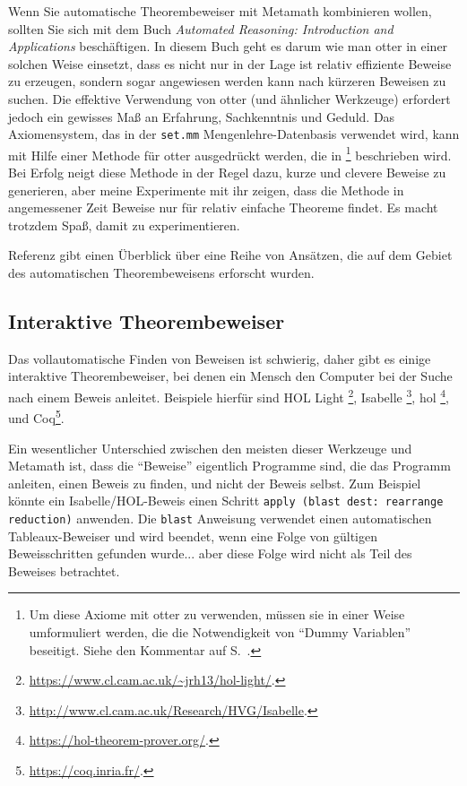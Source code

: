 Wenn Sie automatische Theorembeweiser mit Metamath kombinieren wollen, sollten Sie sich mit dem Buch {\em Automated Reasoning:  Introduction and Applications}\cite{Wos} beschäftigen.  In diesem Buch geht es darum wie man {\sc otter} in einer solchen Weise einsetzt, dass es nicht nur in der Lage ist relativ effiziente Beweise zu erzeugen, sondern sogar angewiesen werden kann nach kürzeren Beweisen zu suchen.  Die effektive Verwendung von {\sc otter} (und ähnlicher Werkzeuge) erfordert jedoch ein gewisses Maß an Erfahrung, Sachkenntnis und Geduld.  Das Axiomensystem, das in der \texttt{set.mm} Mengenlehre-Datenbasis verwendet wird, kann mit Hilfe einer Methode für {\sc otter} ausgedrückt werden, die in \cite{Megill}
\footnote{Um diese Axiome mit {\sc otter} zu verwenden, müssen sie in einer Weise umformuliert werden, die die Notwendigkeit von "`Dummy Variablen"' beseitigt. Siehe den Kommentar
auf S.~\pageref{nodd}.}
beschrieben wird. Bei Erfolg neigt diese Methode in der Regel dazu, kurze und clevere Beweise zu generieren, aber meine Experimente mit ihr zeigen, dass die Methode in angemessener Zeit Beweise nur für relativ einfache Theoreme findet.  Es macht trotzdem Spaß, damit zu experimentieren.

Referenz \cite{Bledsoe} gibt einen Überblick über eine Reihe von Ansätzen,
die auf dem Gebiet des automatischen Theorembeweisens erforscht wurden.

\subsection{Interaktive Theorembeweiser}\label{interactivetheoremprovers}

Das vollautomatische Finden von Beweisen ist schwierig, daher gibt es einige interaktive Theorembeweiser, bei denen ein Mensch den Computer bei der Suche nach einem Beweis anleitet.
Beispiele hierfür sind HOL Light%
\footnote{\url{https://www.cl.cam.ac.uk/~jrh13/hol-light/}.},
Isabelle%
\footnote{\url{http://www.cl.cam.ac.uk/Research/HVG/Isabelle}.},
{\sc hol}%
\footnote{\url{https://hol-theorem-prover.org/}.},
und
Coq\footnote{\url{https://coq.inria.fr/}.}.

Ein wesentlicher Unterschied zwischen den meisten dieser Werkzeuge und Metamath ist, dass die "`Beweise"' eigentlich Programme sind, die das Programm anleiten, einen Beweis zu finden, und nicht der Beweis selbst.
Zum Beispiel könnte ein Isabelle/HOL-Beweis einen Schritt \texttt{apply (blast dest: rearrange reduction)} anwenden. Die \texttt{blast} Anweisung verwendet einen automatischen Tableaux-Beweiser und wird beendet, wenn eine Folge von gültigen Beweisschritten gefunden wurde... aber diese Folge wird nicht als Teil des Beweises betrachtet.

